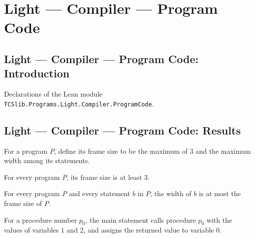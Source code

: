 \section{Light --- Compiler --- Program Code}
\subsection*{Light --- Compiler --- Program Code: Introduction}

Declarations of the Lean module \texttt{TCSlib.Programs.Light.Compiler.ProgramCode}.

\subsection*{Light --- Compiler --- Program Code: Results}

\begin{definition}
\label{Light.Compiler.frameSize}
\leanok
{}
For a program $P$, define its frame size to be the maximum of $3$ and the maximum width
among its statements.
\end{definition}

\begin{theorem}
\label{Light.Compiler.three_le_frameSize}
\leanok
{}
For every program $P$, its frame size is at least $3$.
\end{theorem}

\begin{theorem}
\label{Light.Compiler.width_le_frameSize}
\leanok
{}
For every program $P$ and every statement $b$ in $P$, the width of $b$ is at most the
frame size of $P$.
\end{theorem}

\begin{definition}
\label{Light.mainStmt}
\leanok
{}
For a procedure number $p_0$, the main statement calls procedure $p_0$ with the values
of variables $1$ and $2$, and assigns the returned value to variable $0$.
\end{definition}


